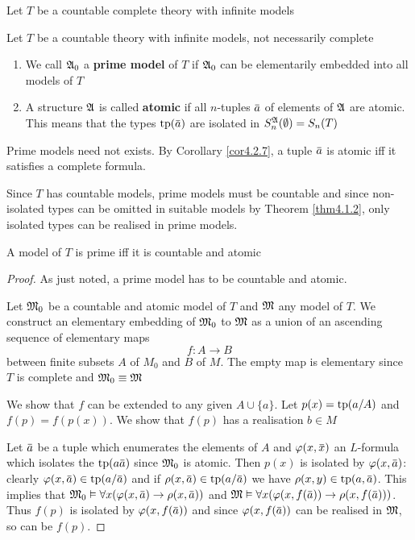 \documentclass[11pt]{article}
\begin{document}
Let \(T\) be a countable complete theory with infinite models
\begin{definition}[]
Let \(T\) be a countable theory with infinite models, not necessarily complete
\begin{enumerate}
\item We call \(\mathfrak{A}_0\) a \textbf{prime model} of \(T\) if \(\mathfrak{A}_0\) can be elementarily embedded into all
models of \(T\)
\item A structure \(\mathfrak{A}\) is called \textbf{atomic} if all \(n\)-tuples \(\bara\) of elements of \(\mathfrak{A}\) are
atomic. This means that the types \(\tp(\bara)\) are isolated in \(S_n^{\mathfrak{A}}(\emptyset)=S_n(T)\)
\end{enumerate}
\end{definition}

Prime models need not exists. By Corollary \ref{cor4.2.7}, a tuple \(\bara\) is atomic iff it
satisfies a complete formula.

Since \(T\) has countable models, prime models must be countable and since non-isolated types
can be omitted in suitable models by Theorem \ref{thm4.1.2}, only isolated types can be realised
in prime models.

\begin{theorem}[]
\label{thm4.5.2}
A model of \(T\) is prime iff it is countable and atomic
\end{theorem}

\begin{proof}
As just noted, a prime model has to be countable and atomic.

Let \(\mathfrak{M}_0\) be a countable and atomic model of \(T\) and \(\mathfrak{M}\) any model of \(T\). We construct
an elementary embedding of \(\mathfrak{M}_0\) to \(\mathfrak{M}\) as a union of an ascending sequence of elementary
maps
\begin{equation*}
f:A\to B
\end{equation*}
between finite subsets \(A\) of \(M_0\) and \(B\) of \(M\). The empty map is elementary
since \(T\) is complete and \(\mathfrak{M}_0\equiv\mathfrak{M}\)

We show that \(f\) can be extended to any given \(A\cup\{a\}\). Let \(p(x)=\operatorname{tp}(a/A)\)
and \(f(p)=f(p(x))\). We show that \(f(p)\) has a realisation \(b\in M\)

Let \(\bara\) be a tuple which enumerates the elements of \(A\) and \(\varphi(x,\barx)\)
an \(L\)-formula which isolates the \(\tp(a\bara)\) since \(\mathfrak{M}_0\) is atomic. Then \(p(x)\) is
isolated by \(\varphi(x,\bara)\): clearly \(\varphi(x,\bara)\in\tp(a/\bara)\) and
if \(\rho(x,\bara)\in\tp(a/\bara)\) we have  \(\rho(x,y)\in\tp(a,\bara)\). This implies
that \(\fM_0\vDash\forall x(\varphi(x,\bara)\to\rho(x,\bara))\) and \(\fM\vDash\forall x(\varphi(x,f(\bara))\to\rho(x,f(\bara)))\). Thus \(f(p)\) is
isolated by \(\varphi(x,f(\bara))\) and since \(\varphi(x,f(\bara))\) can be realised in \(\mathfrak{M}\), so can
be \(f(p)\).
\end{proof}
\end{document}
